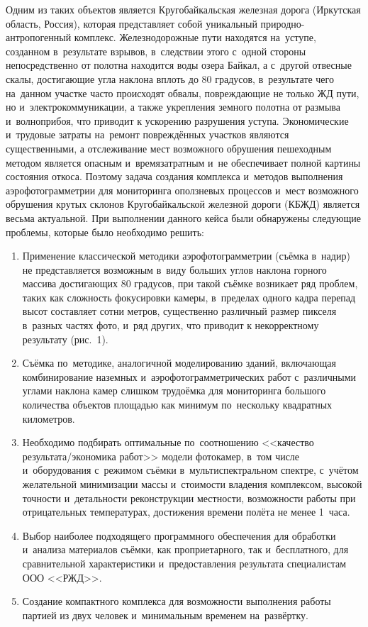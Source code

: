 Одним из таких объектов является Кругобайкальская железная дорога (Иркутская область, Россия), которая представляет собой уникальный природно-антропогенный комплекс. Железнодорожные пути находятся на~уступе, созданном в~результате взрывов, в~следствии этого с~одной стороны непосредственно от полотна находится воды озера Байкал, а с~другой отвесные скалы, достигающие угла наклона вплоть до 80 градусов, в~результате чего на~данном участке часто происходят обвалы, повреждающие не только ЖД пути, но и~электрокоммуникации, а также укрепления земного полотна от размыва и~волноприбоя, что приводит к ускорению разрушения уступа. Экономические и~трудовые затраты на~ремонт повреждённых участков являются существенными, а отслеживание мест возможного обрушения пешеходным методом является опасным и~времязатратным и~не обеспечивает полной картины состояния откоса. Поэтому задача создания комплекса и~методов выполнения аэрофотограмметрии для мониторинга оползневых процессов и~мест возможного обрушения крутых склонов Кругобайкальской железной дороги (КБЖД) является весьма актуальной.
\clearpage
При выполнении данного кейса были обнаружены следующие проблемы, которые было необходимо решить:
\begin{enumerate}[noitemsep]\vspace{-8pt}
\item Применение классической методики аэрофотограмметрии (съёмка в~надир) не представляется возможным в~виду больших углов наклона горного массива достигающих 80 градусов, при такой съёмке возникает ряд проблем, таких как сложность фокусировки камеры, в~пределах одного кадра перепад высот составляет сотни метров, существенно различный размер пикселя в~разных частях фото, и~ряд других, что приводит к некорректному результату (рис.~1).



\item Съёмка по~методике, аналогичной моделированию зданий, включающая комбинирование наземных и~аэрофотограмметрических работ с~различными углами наклона камер слишком трудоёмка для мониторинга большого количества объектов площадью как минимум по~нескольку квадратных километров.
\item Необходимо подбирать оптимальные по~соотношению <<качество результата/экономика работ>> модели фотокамер, в~том числе и~оборудования с~режимом съёмки в~мультиспектральном спектре, с~учётом желательной минимизации массы и~стоимости владения комплексом, высокой точности и~детальности реконструкции местности, возможности работы при отрицательных температурах, достижения времени полёта не менее 1~часа.
\item Выбор наиболее подходящего программного обеспечения для обработки и~анализа материалов съёмки, как проприетарного, так и~бесплатного, для сравнительной характеристики и~предоставления результата специалистам ООО <<РЖД>>.
\item Создание компактного комплекса для возможности выполнения работы партией из двух человек и~минимальным временем на~развёртку.

\end{enumerate}
\vspace{-8pt}

